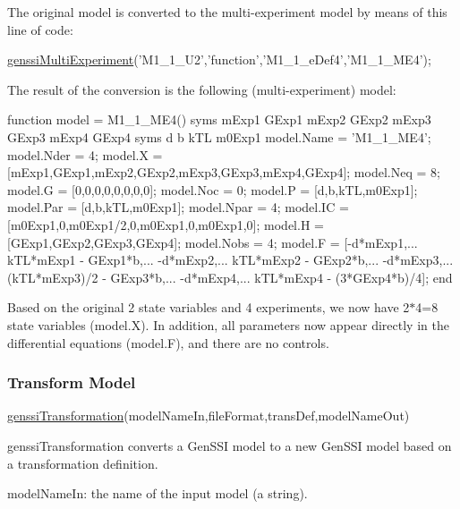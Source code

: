 The original model is converted to the multi-\/experiment model by means of this line of code\+:


\begin{DoxyCode}
\hyperlink{genssi_multi_experiment_8m_a99c14a4d68fa9a17610a21cc6ead7e30}{genssiMultiExperiment}(\textcolor{stringliteral}{'M1\_1\_U2'},\textcolor{stringliteral}{'function'},\textcolor{stringliteral}{'M1\_1\_eDef4'},\textcolor{stringliteral}{'M1\_1\_ME4'}); 
\end{DoxyCode}


The result of the conversion is the following (multi-\/experiment) model\+:


\begin{DoxyCode}
\textcolor{keyword}{function} model = M1\_1\_ME4()
    syms mExp1 GExp1 mExp2 GExp2 mExp3 GExp3 mExp4 GExp4
    syms d b kTL m0Exp1
    model.Name = 'M1\_1\_ME4';
    model.Nder = 4;
    model.X = [mExp1,GExp1,mExp2,GExp2,mExp3,GExp3,mExp4,GExp4];
    model.Neq = 8;
    model.G = [0,0,0,0,0,0,0,0];
    model.Noc = 0;
    model.P = [d,b,kTL,m0Exp1];
    model.Par = [d,b,kTL,m0Exp1];
    model.Npar = 4;
    model.IC = [m0Exp1,0,m0Exp1/2,0,m0Exp1,0,m0Exp1,0];
    model.H = [GExp1,GExp2,GExp3,GExp4];
    model.Nobs = 4;
    model.F = [-d*mExp1,...
               kTL*mExp1 - GExp1*b,...
               -d*mExp2,...
               kTL*mExp2 - GExp2*b,...
               -d*mExp3,...
               (kTL*mExp3)/2 - GExp3*b,...
               -d*mExp4,...
               kTL*mExp4 - (3*GExp4*b)/4];
end
\end{DoxyCode}


Based on the original 2 state variables and 4 experiments, we now have 2$\ast$4=8 state variables (model.\+X). In addition, all parameters now appear directly in the differential equations (model.\+F), and there are no controls.\hypertarget{def_simu_transf}{}\subsubsection{Transform Model}\label{def_simu_transf}

\begin{DoxyCode}
\hyperlink{genssi_transformation_8m_a00c8981ee764669cf32d736351fbf275}{genssiTransformation}(modelNameIn,fileFormat,transDef,modelNameOut) 
\end{DoxyCode}


genssi\+Transformation converts a Gen\+S\+SI model to a new Gen\+S\+SI model based on a transformation definition.

model\+Name\+In\+: the name of the input model (a string).

